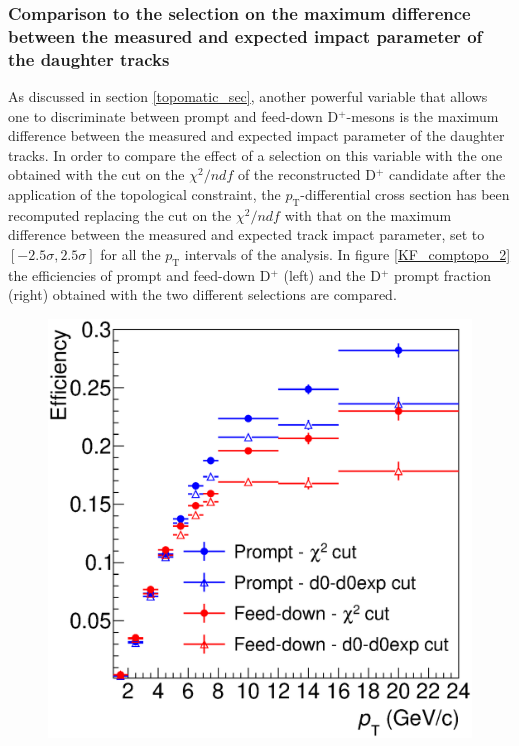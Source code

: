 \documentclass[b5paper,10pt,twoside,oldstyle,classica]{toptesi}
\newcommand{\pt}{p_\text{T}}
\begin{document}
\subsubsection{Comparison to the selection on the maximum difference between the measured and expected impact parameter of the daughter tracks} 
As discussed in section \ref{topomatic_sec}, another powerful variable that allows one to discriminate between prompt and feed-down D$^+$-mesons is the maximum difference between the measured and expected impact parameter of the daughter tracks. In order to compare the effect of a selection on this variable with the one obtained with the cut on the $\chi^2/ndf$ of the reconstructed D$^+$ candidate after the application of the topological constraint, the $\pt$-differential cross section has been recomputed replacing the cut on the $\chi^2/ndf$ with that on the maximum difference between the measured and expected track impact parameter, set to $[-2.5\sigma,2.5\sigma]$ for all the $\pt$ intervals of the analysis. In figure \ref{KF_comptopo_2} the efficiencies of prompt and feed-down D$^+$ (left) and the D$^+$ prompt fraction (right) obtained with the two different selections are compared. \begin{figure}[tb]
\begin{center}
{\includegraphics[scale = 0.31]{Eff_cutset1_cutsettopo.eps}}
\hspace{-0.2cm}

\end{center}
\end{figure}
\end{document}
